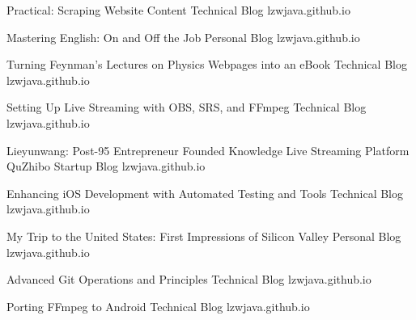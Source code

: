 \begin{cventries}
  \cventry
    {Practical: Scraping Website Content} %
    {Technical Blog} %
    {lzwjava.github.io} %
    {} %
    {
    }

  \cventry
    {Mastering English: On and Off the Job} %
    {Personal Blog} %
    {lzwjava.github.io} %
    {} %
    {
    }

  \cventry
    {Turning Feynman's Lectures on Physics Webpages into an eBook} %
    {Technical Blog} %
    {lzwjava.github.io} %
    {} %
    {
    }

  \cventry
    {Setting Up Live Streaming with OBS, SRS, and FFmpeg} %
    {Technical Blog} %
    {lzwjava.github.io} %
    {} %
    {
    }

  \cventry
    {Lieyunwang: Post-95 Entrepreneur Founded Knowledge Live Streaming Platform QuZhibo} %
    {Startup Blog} %
    {lzwjava.github.io} %
    {} %
    {
    }

  \cventry
    {Enhancing iOS Development with Automated Testing and Tools} %
    {Technical Blog} %
    {lzwjava.github.io} %
    {} %
    {
    }

  \cventry
    {My Trip to the United States: First Impressions of Silicon Valley} %
    {Personal Blog} %
    {lzwjava.github.io} %
    {} %
    {
    }

  \cventry
    {Advanced Git Operations and Principles} %
    {Technical Blog} %
    {lzwjava.github.io} %
    {} %
    {
    }

  \cventry
    {Porting FFmpeg to Android} %
    {Technical Blog} %
    {lzwjava.github.io} %
    {} %
    {
    }

\end{cventries}
